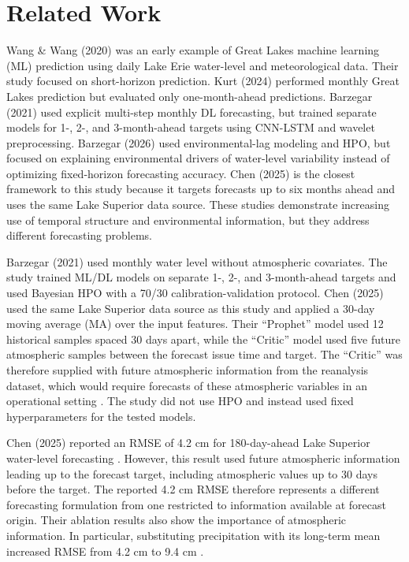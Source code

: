 \documentclass[conference]{IEEEtran}
\begin{document}
\section{Related Work}

Wang \& Wang (2020) \cite{wang2020lakeerie} was an early example of Great Lakes machine learning (ML) prediction using daily Lake Erie water-level and meteorological data. Their study focused on short-horizon prediction. Kurt (2024) \cite{kurt2024greatlakes} performed monthly Great Lakes prediction but evaluated only one-month-ahead predictions. Barzegar (2021) \cite{barzegar2021cnn} used explicit multi-step monthly DL forecasting, but trained separate models for 1-, 2-, and 3-month-ahead targets using CNN-LSTM and wavelet preprocessing. Barzegar (2026) \cite{barzegar2026interpretable} used environmental-lag modeling and HPO, but focused on explaining environmental drivers of water-level variability instead of optimizing fixed-horizon forecasting accuracy. Chen (2025) \cite{chen2025dualtransformer} is the closest framework to this study because it targets forecasts up to six months ahead and uses the same Lake Superior data source. These studies demonstrate increasing use of temporal structure and environmental information, but they address different forecasting problems.

Barzegar (2021) \cite{barzegar2021cnn} used monthly water level without atmospheric covariates. The study trained ML/DL models on separate 1-, 2-, and 3-month-ahead targets and used Bayesian HPO with a 70/30 calibration-validation protocol. Chen (2025) \cite{chen2025dualtransformer} used the same Lake Superior data source as this study and applied a 30-day moving average (MA) over the input features. Their ``Prophet'' model used 12 historical samples spaced 30 days apart, while the ``Critic'' model used five future atmospheric samples between the forecast issue time and target. The ``Critic'' was therefore supplied with future atmospheric information from the reanalysis dataset, which would require forecasts of these atmospheric variables in an operational setting \cite{chen2025dualtransformer}. The study did not use HPO and instead used fixed hyperparameters for the tested models.

Chen (2025) reported an RMSE of 4.2 cm for 180-day-ahead Lake Superior water-level forecasting \cite{chen2025dualtransformer}. However, this result used future atmospheric information leading up to the forecast target, including atmospheric values up to 30 days before the target. The reported 4.2 cm RMSE therefore represents a different forecasting formulation from one restricted to information available at forecast origin. Their ablation results also show the importance of atmospheric information. In particular, substituting precipitation with its long-term mean increased RMSE from 4.2 cm to 9.4 cm \cite{chen2025dualtransformer}.
\end{document}
